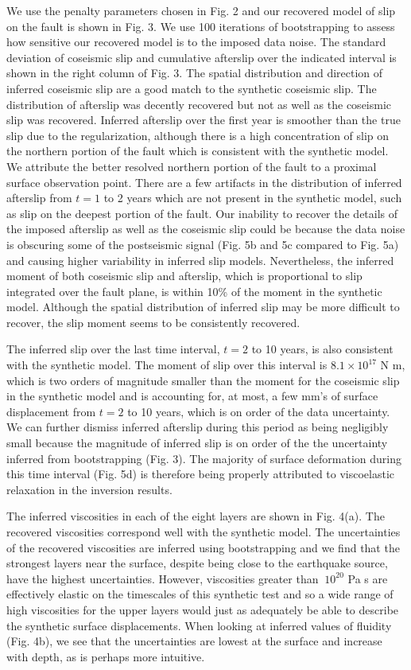 \documentclass[extra,mreferee]{gji}
\begin{document}
We use the penalty parameters chosen in Fig. 2 and our recovered model
of slip on the fault is shown in Fig. 3.  We use 100 iterations of
bootstrapping to assess how sensitive our recovered model is to the
imposed data noise.  The standard deviation of coseismic slip and
cumulative afterslip over the indicated interval is shown in the right
column of Fig. 3.  The spatial distribution and direction of inferred
coseismic slip are a good match to the synthetic coseismic slip.  The
distribution of afterslip was decently recovered but not as well as
the coseismic slip was recovered. Inferred afterslip over the first
year is smoother than the true slip due to the regularization,
although there is a high concentration of slip on the northern portion
of the fault which is consistent with the synthetic model.  We
attribute the better resolved northern portion of the fault to a
proximal surface observation point.  There are a few artifacts in the
distribution of inferred afterslip from $t=1$ to 2 years which are not
present in the synthetic model, such as slip on the deepest portion of
the fault. Our inability to recover the details of the imposed
afterslip as well as the coseismic slip could be because the data
noise is obscuring some of the postseismic signal (Fig. 5b and 5c
compared to Fig. 5a) and causing higher variability in inferred slip
models. Nevertheless, the inferred moment of both coseismic slip and
afterslip, which is proportional to slip integrated over the fault
plane, is within 10\% of the moment in the synthetic model.  Although
the spatial distribution of inferred slip may be more difficult to
recover, the slip moment seems to be consistently recovered.

The inferred slip over the last time interval, $t=2$ to 10 years, is
also consistent with the synthetic model.  The moment of slip over
this interval is $8.1\times 10^{17}$ N m, which is two orders of
magnitude smaller than the moment for the coseismic slip in the
synthetic model and is accounting for, at most, a few mm's of surface
displacement from $t=2$ to 10 years, which is on order of the data
uncertainty. We can further dismiss inferred afterslip during this
period as being negligibly small because the magnitude of inferred
slip is on order of the the uncertainty inferred from bootstrapping
(Fig. 3).  The majority of surface deformation during this time
interval (Fig. 5d) is therefore being properly attributed to
viscoelastic relaxation in the inversion results.

The inferred viscosities in each of the eight layers are shown in
Fig. 4(a).  The recovered viscosities correspond well with the
synthetic model.  The uncertainties of the recovered viscosities are
inferred using bootstrapping and we find that the strongest layers
near the surface, despite being close to the earthquake source,
have the highest uncertainties.  However, viscosities greater than
$~10^{20}$ Pa s are effectively elastic on the timescales of this
synthetic test and so a wide range of high viscosities for the upper
layers would just as adequately be able to describe the synthetic
surface displacements.  When looking at inferred values of fluidity
(Fig. 4b), we see that the uncertainties are lowest at the surface and
increase with depth, as is perhaps more intuitive.
\end{document}
